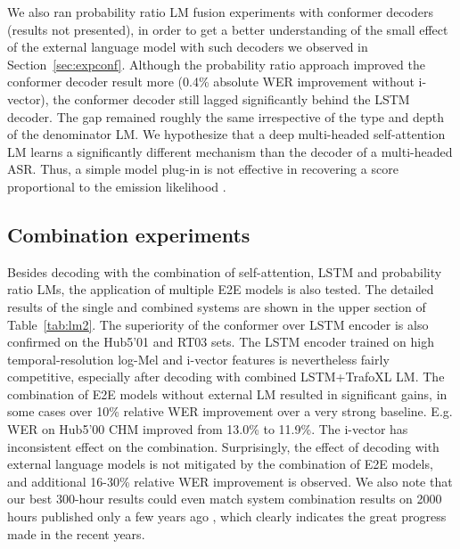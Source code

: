 \documentclass[a4paper]{article}
\begin{document}
We also ran probability ratio LM fusion experiments with conformer decoders (results not presented), in order to get a better understanding of  the small effect of the external language model with such decoders we observed in Section~\ref{sec:expconf}.
Although the probability ratio approach improved the conformer decoder result more (0.4\% absolute WER improvement without i-vector), the conformer decoder still lagged significantly behind the LSTM decoder.
The gap remained roughly the same irrespective of the type and depth of the denominator LM.
We hypothesize that a deep multi-headed self-attention LM learns a significantly different mechanism than the decoder of a multi-headed ASR.
Thus, a simple model plug-in is not effective in recovering a score proportional to the emission likelihood .

\vspace{-1.5mm}
\subsection{Combination experiments}
\vspace{-1mm}
Besides decoding with the combination of self-attention, LSTM and probability ratio LMs, the application of multiple E2E models is also tested.
The detailed results of the single and combined systems are shown in the upper section of Table~\ref{tab:lm2}.
The superiority of the conformer over LSTM encoder is also confirmed on the Hub5'01 and RT03 sets.
The LSTM encoder trained on high temporal-resolution log-Mel and i-vector features is nevertheless fairly competitive, especially after decoding with combined LSTM+TrafoXL LM.
The combination of E2E models without external LM resulted in significant gains, in some cases over 10\% relative WER improvement over a very strong baseline.
E.g. WER on Hub5'00 CHM improved from 13.0\% to 11.9\%.
The i-vector has inconsistent effect on the combination.
Surprisingly, the effect of decoding with external language models is not mitigated by the combination of E2E models, and additional 16-30\% relative WER improvement is observed.
We also note that our best 300-hour results could even match system combination results on 2000 hours published only a few years ago \cite{capio}, which clearly indicates the great progress made in the recent years.


\vspace{-2mm}
\end{document}

